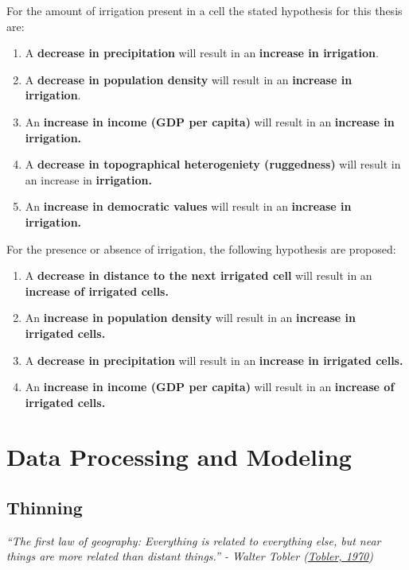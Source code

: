 \documentclass[12pt,twoside]{reedthesis}
\providecommand{\tightlist}{%
  \setlength{\itemsep}{0pt}\setlength{\parskip}{0pt}}
\begin{document}
For the amount of irrigation present in a cell the stated hypothesis for this thesis are:
\begin{enumerate}
\def\labelenumi{\arabic{enumi}.}
\tightlist
\item
  A \textbf{decrease in precipitation} will result in an \textbf{increase in irrigation}.
\item
  A \textbf{decrease in population density} will result in an \textbf{increase in irrigation}.
\item
  An \textbf{increase in income (GDP per capita)} will result in an \textbf{increase in irrigation.}
\item
  A \textbf{decrease in topographical heterogeniety (ruggedness)} will result in an increase in \textbf{irrigation.}
\item
  An \textbf{increase in democratic values} will result in an \textbf{increase in irrigation.}
\end{enumerate}
For the presence or absence of irrigation, the following hypothesis are proposed:
\begin{enumerate}
\def\labelenumi{\arabic{enumi}.}
\tightlist
\item
  A \textbf{decrease in distance to the next irrigated cell} will result in an \textbf{increase of irrigated cells.}
\item
  An \textbf{increase in population density} will result in an \textbf{increase in irrigated cells.}
\item
  A \textbf{decrease in precipitation} will result in an \textbf{increase in irrigated cells.}
\item
  An \textbf{increase in income (GDP per capita)} will result in an \textbf{increase of irrigated cells.}
\end{enumerate}
\hypertarget{data-processing-and-modeling}{%
\section{Data Processing and Modeling}\label{data-processing-and-modeling}}

\hypertarget{thin}{%
\subsection{Thinning}\label{thin}}

\emph{``The first law of geography: Everything is related to everything else, but near things are more related than distant things.'' - Walter Tobler (\protect\hyperlink{ref-toblerComputerMovieSimulating1970}{Tobler, 1970})}
\end{document}
